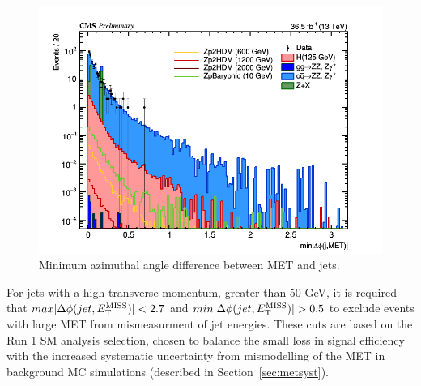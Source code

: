 \begin{figure}[tbh]
\centering
\includegraphics[width=5in]{figures/hist_hDPHI_MIN_JET_MET_8.png}
\caption{Minimum azimuthal angle difference between MET and jets.}
\label{fig:mindeltaphijmet}
\end{figure}

For jets with a high transverse momentum, greater than 50 GeV, it is required that $max|\Delta\phi(jet, E_{\rm{T}}^{\rm{MISS}})|<2.7$ and $min|\Delta\phi(jet, E_{\rm{T}}^{\rm{MISS}})|>0.5$ to exclude events with large MET from mismeasurment of jet energies. These cuts are based on the Run 1 SM analysis selection, chosen to balance the small loss in signal efficiency with the increased systematic uncertainty from mismodelling of the MET in background MC simulations (described in Section~\ref{sec:metsyst}).

